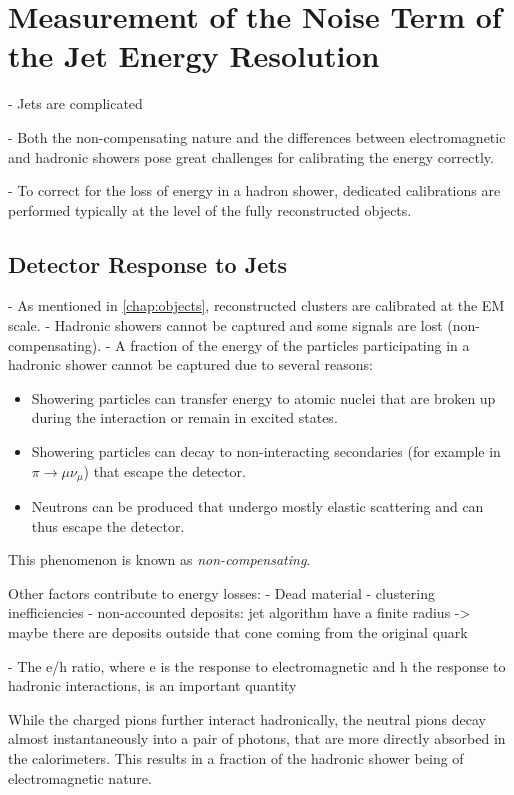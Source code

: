 \chapter{Measurement of the Noise Term of the Jet Energy Resolution}
\label{chap:calibration}

- Jets are complicated

- Both the non-compensating nature and the differences between electromagnetic and hadronic showers pose great challenges for calibrating the energy correctly.

- To correct for the loss of energy in a hadron shower, dedicated calibrations are performed typically at the level of the fully reconstructed objects.


\section{Detector Response to Jets}
- As mentioned in \cref{chap:objects}, reconstructed clusters are calibrated at the EM scale. 
- Hadronic showers cannot be captured and some signals are lost (non-compensating). 
- A fraction of the energy of the particles participating in a hadronic shower cannot be captured due to several reasons:
\begin{itemize}
    \item Showering particles can transfer energy to atomic nuclei that are broken up during the interaction or remain in excited states.
    \item Showering particles can decay to non-interacting secondaries (for example in $\pi \rightarrow \mu \nu_\mu$) that escape the detector.
    \item Neutrons can be produced that undergo mostly elastic scattering and can thus escape the detector.
\end{itemize}
This phenomenon is known as \emph{non-compensating}.

Other factors contribute to energy losses:
- Dead material
- clustering inefficiencies
- non-accounted deposits: jet algorithm have a finite radius -> maybe there are deposits outside that cone coming from the original quark

- The e/h ratio, where e is the response to electromagnetic and h the response to hadronic interactions, is an important quantity 


While the charged pions further interact hadronically, the neutral pions decay almost instantaneously into a pair of photons, that are more directly absorbed in the calorimeters. This results in a fraction of the hadronic shower being of electromagnetic nature.

